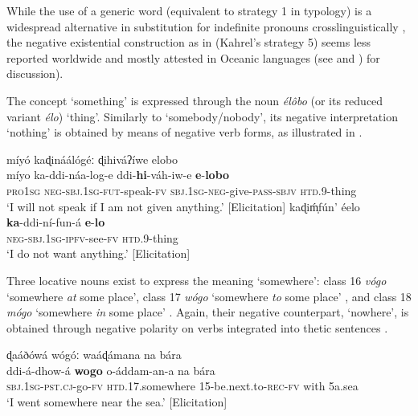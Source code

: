 \documentclass[output=paper,colorlinks=true, citecolor=brown,draftmode]{langscibook}
\begin{document}
While the use of a generic word (equivalent to strategy 1 in  typology) is a widespread alternative in substitution for indefinite pronouns crosslinguistically \citep[53]{Haspelmath1997}, the negative existential construction as in  (Kahrel’s strategy 5) seems less reported worldwide and mostly attested in Oceanic languages (see \citealt[52--57]{Haspelmath1997} and \citealt[118--123]{Veselinova2013neg.exist}) for discussion).

The concept \textsc{‘}something’ is expressed through the noun \textit{élôbo} (or its reduced variant \textit{élo}) ‘thing’. Similarly to ‘somebody/nobody’, its negative interpretation ‘nothing’ is obtained by means of negative verb forms, as illustrated in . 

{
\ea\label{ex:cuw:59}
    \ea\label{ex:cuw:59a} míyó kaɖináálógéː ɖihiváʔíwe elobo\\ 
       \gll míyo ka-ddi-náa-log-e ddi-\textbf{hi}{}-váh-iw-e \textbf{e}{}-\textbf{lobo}\\
          \textsc{pro1sg} \textsc{neg-sbj.1sg-fut}{}-speak-\textsc{fv} \textsc{sbj.1sg-neg-}give-\textsc{pass-sbjv} \textsc{htd.9}{}-thing \\
        \glt  ‘I will not speak if I am not given anything.’ [Elicitation]
    \ex\label{ex:cuw:59b} kaɖiḿ̩fún’ éelo \\
        \gll  \textbf{ka}{}-ddi-ní-fun-á \textbf{e}{}-\textbf{lo}\\
              \textsc{neg-sbj.1sg-ipfv}{}-see-\textsc{fv} \textsc{htd.9}{}-thing  \\
        \glt  ‘I do not want anything.’ [Elicitation]
    \z
\z }

Three locative nouns exist to express the meaning ‘somewhere’: class 16 \textit{vógo} ‘somewhere \textit{at} some place’, class 17 \textit{wógo} ‘somewhere \textit{to} some place’ , and class 18 \textit{mógo} ‘somewhere \textit{in} some place’ . Again, their negative counterpart, ‘nowhere’, is obtained through negative polarity on verbs integrated into thetic sentences .

\ea\label{ex:cuw:60}
    \ea\label{ex:cuw:60a} ɖaáðówá wógóː waáɖámana na bára\\ 
        \gll  ddi-á-dhow-á \textbf{wogo} o-áddam-an{}-a na bára \\
               \textsc{sbj.1sg-pst.cj}{}-go-\textsc{fv} \textsc{htd.17}.somewhere \textsc{15-}be.next.to-\textsc{rec-fv} with 5a.sea\\
        \glt  ‘I went somewhere near the sea.’ [Elicitation]
\end{document}
